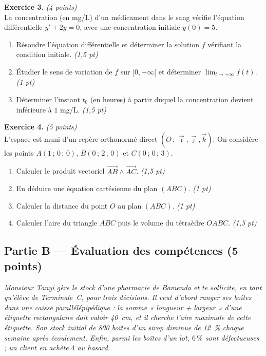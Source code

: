 \smallskip
\noindent\textbf{Exercice 3.} \hfill\textit{(4 points)}\\
La concentration (en mg/L) d'un médicament dans le sang vérifie l'équation différentielle
$y'+2y=0$, avec une concentration initiale $y(0)=5$.
\begin{enumerate}[label=\arabic*)]
\item Résoudre l'équation différentielle et déterminer la solution $f$ vérifiant la
condition initiale. \hfill\textit{(1,5 pt)}
\item Étudier le sens de variation de $f$ sur $[0,+\infty[$ et déterminer
$\displaystyle\lim_{t\to+\infty}f(t)$. \hfill\textit{(1 pt)}
\item Déterminer l'instant $t_0$ (en heures) à partir duquel la concentration devient
inférieure à $1$ mg/L. \hfill\textit{(1,5 pt)}
\end{enumerate}

\smallskip
\noindent\textbf{Exercice 4.} \hfill\textit{(5 points)}\\
L'espace est muni d'un repère orthonormé direct $(O\,;\,\vec\imath,\vec\jmath,\vec k)$. On
considère les points $A(1\,;\,0\,;\,0)$, $B(0\,;\,2\,;\,0)$ et $C(0\,;\,0\,;\,3)$.
\begin{enumerate}[label=\arabic*)]
\item Calculer le produit vectoriel $\vec{AB}\wedge\vec{AC}$. \hfill\textit{(1,5 pt)}
\item En déduire une équation cartésienne du plan $(ABC)$. \hfill\textit{(1 pt)}
\item Calculer la distance du point $O$ au plan $(ABC)$. \hfill\textit{(1 pt)}
\item Calculer l'aire du triangle $ABC$ puis le volume du tétraèdre $OABC$. \hfill\textit{(1,5 pt)}
\end{enumerate}

\subsection*{Partie B — Évaluation des compétences \hfill (5 points)}

\noindent\textit{Monsieur Tanyi gère le stock d'une pharmacie de Bamenda et te sollicite, en
tant qu'élève de Terminale~C, pour trois décisions. Il veut d'abord ranger ses boîtes dans
une caisse parallélépipédique : la somme « longueur + largeur » d'une étiquette
rectangulaire doit valoir \SI{40}{\centi\metre}, et il cherche l'aire maximale de cette
étiquette. Son stock initial de \SI{800}{} boîtes d'un sirop diminue de \SI{12}{\percent}
chaque semaine après écoulement. Enfin, parmi les boîtes d'un lot, $6\,\%$ sont défectueuses ;
un client en achète $4$ au hasard.}

